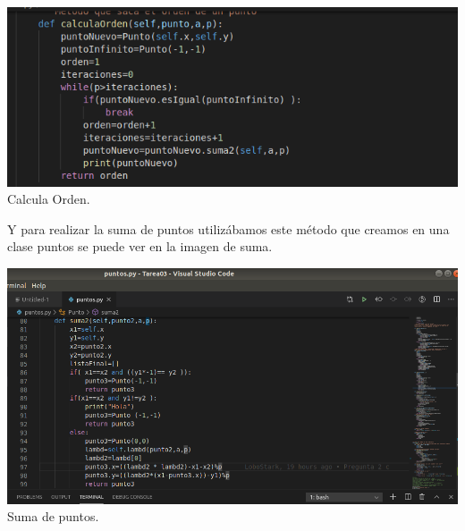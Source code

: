 \documentclass[10pt,a4paper]{article}
\begin{document}
\begin{enumerate}
\begin{itemize}
\begin{center}
\includegraphics[scale=.5]{img/orden.png}
\\Calcula Orden.
\end{center}
Y para realizar la suma de puntos utilizábamos este método que creamos en una clase puntos se puede ver en la imagen de suma.\\
\begin{center}
\includegraphics[scale=0.4]{img/suma.png}
\\Suma de puntos.
\end{center}



\end{itemize}
\end{enumerate}
\end{document}
